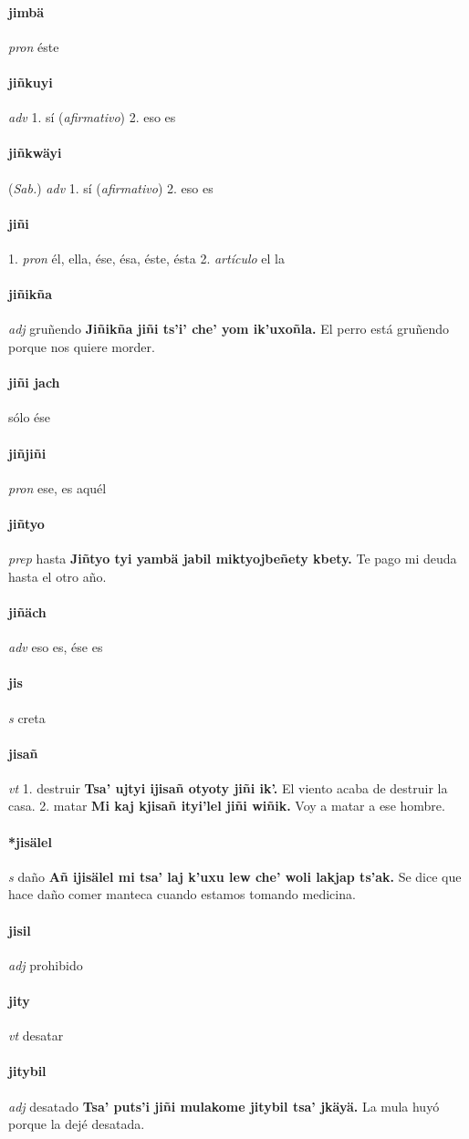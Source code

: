 \documentclass{scrbook}
\newcommand{\entry}[1]{\paragraph{#1}}
\newcommand{\onedefinition}[1]{#1.}
\newcommand{\partofspeech}[1]{\textit{#1}}
\newcommand{\spanishtranslation}[1]{#1}
\newcommand{\clarification}[1]{(\textit{#1})}
\newcommand{\cholexample}[1]{\textbf{#1}}
\newcommand{\exampletranslation}[1]{#1}
\newcommand{\relevantdialect}[1]{(\textit{#1})}
\begin{document}
\begin{multicols}{2}
\entry{jimbä}
\partofspeech{pron}
\spanishtranslation{éste}

\entry{jiñkuyi}
\partofspeech{adv}
\onedefinition{1}
\spanishtranslation{sí}
\clarification{afirmativo}
\onedefinition{2}
\spanishtranslation{eso es}

\entry{jiñkwäyi}
\relevantdialect{Sab.}
\partofspeech{adv}
\onedefinition{1}
\spanishtranslation{sí}
\clarification{afirmativo}
\onedefinition{2}
\spanishtranslation{eso es}

\entry{jiñi}
\onedefinition{1}
\partofspeech{pron}
\spanishtranslation{él, ella, ése, ésa, éste, ésta}
\onedefinition{2}
\partofspeech{artículo}
\spanishtranslation{el}
\spanishtranslation{la}

\entry{jiñikña}
\partofspeech{adj}
\spanishtranslation{gruñendo}
\cholexample{Jiñikña jiñi ts'i' che' yom ik'uxoñla.}
\exampletranslation{El perro está gruñendo porque nos quiere morder.}

\entry{jiñi jach}
\spanishtranslation{sólo ése}

\entry{jiñjiñi}
\partofspeech{pron}
\spanishtranslation{ese, es aquél}

\entry{jiñtyo}
\partofspeech{prep}
\spanishtranslation{hasta}
\cholexample{Jiñtyo tyi yambä jabil miktyojbeñety kbety.}
\exampletranslation{Te pago mi deuda hasta el otro año.}

\entry{jiñäch}
\partofspeech{adv}
\spanishtranslation{eso es, ése es}

\entry{jis}
\partofspeech{s}
\spanishtranslation{creta}

\entry{jisañ}
\partofspeech{vt}
\onedefinition{1}
\spanishtranslation{destruir}
\cholexample{Tsa' ujtyi ijisañ otyoty jiñi ik'.}
\exampletranslation{El viento acaba de destruir la casa.}
\onedefinition{2}
\spanishtranslation{matar}
\cholexample{Mi kaj kjisañ ityi'lel jiñi wiñik.}
\exampletranslation{Voy a matar a ese hombre.}

\entry{*jisälel}
\partofspeech{s}
\spanishtranslation{daño}
\cholexample{Añ ijisälel mi tsa' laj k'uxu lew che' woli lakjap ts'ak.}
\exampletranslation{Se dice que hace daño comer manteca cuando estamos tomando medicina.}

\entry{jisil}
\partofspeech{adj}
\spanishtranslation{prohibido}

\entry{jity}
\partofspeech{vt}
\spanishtranslation{desatar}

\entry{jitybil}
\partofspeech{adj}
\spanishtranslation{desatado}
\cholexample{Tsa' puts'i jiñi mulakome jitybil tsa' jkäyä.}
\exampletranslation{La mula huyó porque la dejé desatada.}


\end{multicols}
\end{document}
